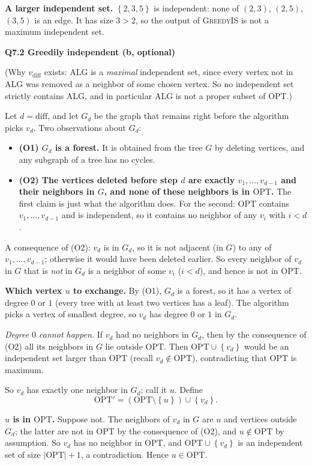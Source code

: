 \documentclass[11pt]{article}
\newcommand{\set}[1]{\left\{#1\right\}}
\newcommand{\abs}[1]{\left|#1\right|}
\newcommand{\OPT}{\mathrm{OPT}}
\newcommand{\ALG}{\mathrm{ALG}}
\newcommand{\algo}[1]{\textsc{#1}}
\newcommand{\qpage}[1]{\clearpage\noindent\textbf{\large #1}\par\medskip}
\begin{document}
\textbf{A larger independent set.}
$\set{2,3,5}$ is independent: none of $(2,3)$, $(2,5)$, $(3,5)$ is an edge.
It has size $3 > 2$, so the output of \algo{GreedyIS} is not a maximum independent set.
    

\qpage{Q7.2 Greedily independent (b, optional)}

(Why $v_{\text{diff}}$ exists: $\ALG$ is a \emph{maximal} independent set, since every vertex not in $\ALG$ was removed as a neighbor of some chosen vertex.
So no independent set strictly contains $\ALG$, and in particular $\ALG$ is not a proper subset of $\OPT$.)

Let $d = \text{diff}$, and let $G_d$ be the graph that remains right before the algorithm picks $v_d$.
Two observations about $G_d$:

\begin{itemize}
  \item \textbf{(O1) $G_d$ is a forest.} It is obtained from the tree $G$ by deleting vertices, and any subgraph of a tree has no cycles.
  \item \textbf{(O2) The vertices deleted before step $d$ are exactly $v_1,\dots,v_{d-1}$ and their neighbors in $G$, and none of these neighbors is in $\OPT$.}
  The first claim is just what the algorithm does.
  For the second: $\OPT$ contains $v_1,\dots,v_{d-1}$ and is independent, so it contains no neighbor of any $v_i$ with $i<d$.
\end{itemize}
A consequence of (O2): $v_d$ is in $G_d$, so it is not adjacent (in $G$) to any of $v_1,\dots,v_{d-1}$; otherwise it would have been deleted earlier.
So every neighbor of $v_d$ in $G$ that is \emph{not} in $G_d$ is a neighbor of some $v_i$ ($i<d$), and hence is not in $\OPT$.

\textbf{Which vertex $u$ to exchange.}
By (O1), $G_d$ is a forest, so it has a vertex of degree $0$ or $1$ (every tree with at least two vertices has a leaf).
The algorithm picks a vertex of smallest degree, so $v_d$ has degree $0$ or $1$ in $G_d$.

\emph{Degree $0$ cannot happen.}
If $v_d$ had no neighbors in $G_d$, then by the consequence of (O2) all its neighbors in $G$ lie outside $\OPT$.
Then $\OPT \cup \set{v_d}$ would be an independent set larger than $\OPT$ (recall $v_d \notin \OPT$), contradicting that $\OPT$ is maximum.

So $v_d$ has exactly one neighbor in $G_d$; call it $u$.
Define
\[
  \OPT' = (\OPT \setminus \set{u}) \cup \set{v_d}.
\]

\textbf{$u$ is in $\OPT$.}
Suppose not.
The neighbors of $v_d$ in $G$ are $u$ and vertices outside $G_d$; the latter are not in $\OPT$ by the consequence of (O2), and $u \notin \OPT$ by assumption.
So $v_d$ has no neighbor in $\OPT$, and $\OPT \cup \set{v_d}$ is an independent set of size $\abs{\OPT}+1$, a contradiction.
Hence $u \in \OPT$.
\end{document}
